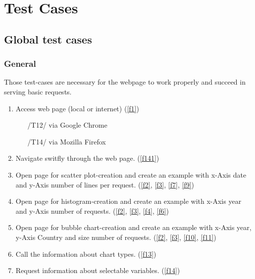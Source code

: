 \section{Test Cases}

\subsection{Global test cases}

\renewcommand{\theenumi}{/T\arabic{enumi}0/}
\renewcommand{\labelenumi}{\theenumi}

\subsubsection{General}

Those test-cases are necessary for the webpage to work 
properly and succeed in serving basic requests.

\begin{enumerate}

\item Access web page (local or internet) (\ref{f1})
\begin{enumerate}
  \item[/T12/] via Google Chrome
  \item[/T14/] via Mozilla Firefox
\end{enumerate}
\label{t10}

\item Navigate switfly through the web page. (\ref{f141}) 
\label{t11}

\item Open page for scatter plot-creation and create an example
      with x-Axis date and y-Axis number of lines per request. (\ref{f2}, \ref{f3}, \ref{f7}, \ref{f9})
\label{t12}

\item Open page for histogram-creation and create an example
      with x-Axis year and y-Axis number of requests. (\ref{f2}, \ref{f3}, \ref{f4}, \ref{f6})
\label{t13}

\item Open page for bubble chart-creation and create an example
      with x-Axis year, y-Axis Country and size number of requests. (\ref{f2}, \ref{f3}, \ref{f10}, \ref{f11})
\label{t14}

\item Call the information about chart types. (\ref{f13})
\label{t15}

\item Request information about selectable variables. (\ref{f14})
\label{t16}

\end{enumerate}

